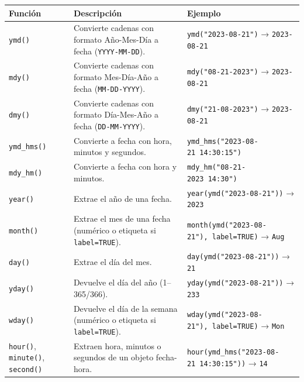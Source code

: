 \documentclass[
]{book}
\begin{document}
\begin{longtable}[]{@{}
  >{\raggedright\arraybackslash}p{}
  >{\raggedright\arraybackslash}p{}
  >{\raggedright\arraybackslash}p{}@{}}
\toprule\noalign{}
\begin{minipage}[b]{\linewidth}\raggedright
Función
\end{minipage} & \begin{minipage}[b]{\linewidth}\raggedright
Descripción
\end{minipage} & \begin{minipage}[b]{\linewidth}\raggedright
Ejemplo
\end{minipage} \\
\midrule\noalign{}
\endhead
\bottomrule\noalign{}
\endlastfoot
\texttt{ymd()} & Convierte cadenas con formato Año-Mes-Día a fecha (\texttt{YYYY-MM-DD}). & \texttt{ymd("2023-08-21")} → \texttt{2023-08-21} \\
\texttt{mdy()} & Convierte cadenas con formato Mes-Día-Año a fecha (\texttt{MM-DD-YYYY}). & \texttt{mdy("08-21-2023")} → \texttt{2023-08-21} \\
\texttt{dmy()} & Convierte cadenas con formato Día-Mes-Año a fecha (\texttt{DD-MM-YYYY}). & \texttt{dmy("21-08-2023")} → \texttt{2023-08-21} \\
\texttt{ymd\_hms()} & Convierte a fecha con hora, minutos y segundos. & \texttt{ymd\_hms("2023-08-21\ 14:30:15")} \\
\texttt{mdy\_hm()} & Convierte a fecha con hora y minutos. & \texttt{mdy\_hm("08-21-2023\ 14:30")} \\
\texttt{year()} & Extrae el año de una fecha. & \texttt{year(ymd("2023-08-21"))} → \texttt{2023} \\
\texttt{month()} & Extrae el mes de una fecha (numérico o etiqueta si \texttt{label=TRUE}). & \texttt{month(ymd("2023-08-21"),\ label=TRUE)} → \texttt{Aug} \\
\texttt{day()} & Extrae el día del mes. & \texttt{day(ymd("2023-08-21"))} → \texttt{21} \\
\texttt{yday()} & Devuelve el día del año (1--365/366). & \texttt{yday(ymd("2023-08-21"))} → \texttt{233} \\
\texttt{wday()} & Devuelve el día de la semana (numérico o etiqueta si \texttt{label=TRUE}). & \texttt{wday(ymd("2023-08-21"),\ label=TRUE)} → \texttt{Mon} \\
\texttt{hour()}, \texttt{minute()}, \texttt{second()} & Extraen hora, minutos o segundos de un objeto fecha-hora. & \texttt{hour(ymd\_hms("2023-08-21\ 14:30:15"))} → \texttt{14} \\
\end{longtable}
\end{document}
